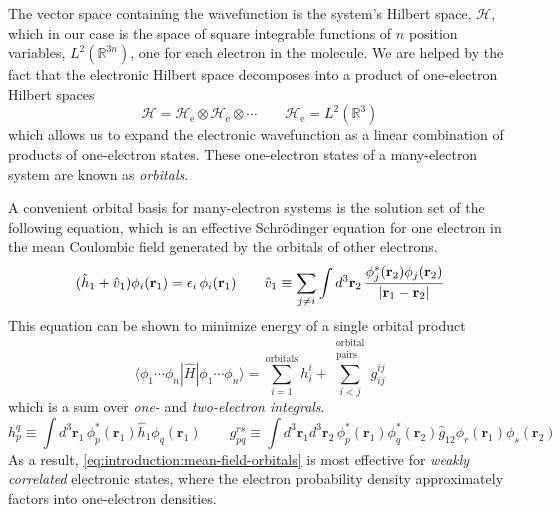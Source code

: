 The vector space containing the wavefunction is the system's Hilbert space,
\(\mathcal{H}\), which in our case is the space of square integrable functions
of \(n\) position variables,
\(
    L^2(\mathbb{R}^{3n})
\),
one for each electron in the molecule.
We are helped by the fact that the electronic Hilbert space decomposes into a
product of one-electron Hilbert spaces
\begin{equation}
    \mathcal{H}
    =
    \mathcal{H}_\mathrm{e}
    \otimes
    \mathcal{H}_\mathrm{e}
    \otimes
    \cdots
    \qquad
    \mathcal{H}_\mathrm{e}
    =
    L^2(\mathbb{R}^3)
\end{equation}
which allows us to expand the electronic wavefunction as a linear combination of
products of one-electron states.
These one-electron states of a many-electron system are known as {\itshape
orbitals}.

A convenient orbital basis for many-electron systems is the solution set of the
following equation, which is an effective Schr\"odinger equation for one
electron in the mean Coulombic field generated by the orbitals of other
electrons.
\begin{equation}
    \label{eq:introduction:mean-field-orbitals}
    (
        \hat{h}_1
        +
        \hat{v}_1
    )
    \phi_i(\mathbf{r}_1)
    =
    \epsilon_i\,
    \phi_i(\mathbf{r}_1)
    \qquad
    \hat{v}_1
    \equiv
    \sum_{j\neq i}
    \int
    d^3\mathbf{r}_2\,
    \frac{%
        \phi_j^*(\mathbf{r}_2)\phi_j(\mathbf{r}_2)
    }{%
        |\mathbf{r}_1 - \mathbf{r}_2|
    }
\end{equation}
This equation can be shown to minimize energy of a single orbital product
\begin{equation}
    \label{eq:introduction:orbital-product-expectation-value}
    \langle \phi_1\cdots \phi_n|
    \hat{H}
    |\phi_1\cdots \phi_n \rangle
    =
    \sum_{i=1}^\mathrm{orbitals}
    h_i^i
    +
    \sum_{i<j}^{\substack{\mathrm{orbital}\\\mathrm{pairs}}}
    g_{ij}^{ij}
\end{equation}
which is a sum over {\itshape one-} and {\itshape two-electron integrals}.
\begin{equation}
    h_p^q
    \equiv
    \int
    d^3\mathbf{r}_1\,
    \phi_p^*(\mathbf{r}_1)
    \hat{h}_1
    \phi_q(\mathbf{r}_1)
    \qquad
    g_{pq}^{rs}
    \equiv
    \int
    d^3\mathbf{r}_1
    d^3\mathbf{r}_2\,
    \phi_p^*(\mathbf{r}_1)
    \phi_q^*(\mathbf{r}_2)
    \hat{g}_{12}
    \phi_r(\mathbf{r}_1)
    \phi_s(\mathbf{r}_2)
\end{equation}
As a result, \cref{eq:introduction:mean-field-orbitals} is most effective for
{\itshape weakly correlated} electronic states, where the electron probability
density approximately factors into one-electron densities.

